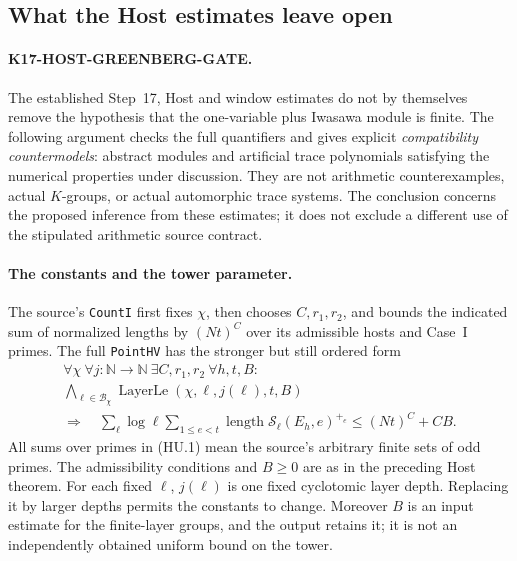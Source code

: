 \subsection{What the Host estimates leave open}
\label{sec:host-uniformity-gate}

\paragraph{K17-HOST-GREENBERG-GATE.}
The established Step~17, Host and window estimates do not by themselves
remove the hypothesis that the one-variable plus Iwasawa module is
finite.  The following argument checks the full quantifiers and gives
explicit \emph{compatibility countermodels}: abstract modules and
artificial trace polynomials satisfying the numerical properties under
discussion.  They are not arithmetic counterexamples, actual
$K$-groups, or actual automorphic trace systems.  The conclusion
concerns the proposed inference from these estimates; it does not
exclude a different use of the stipulated arithmetic source contract.

\paragraph{The constants and the tower parameter.}
The source's \texttt{CountI} first fixes $\chi$, then chooses
$C,r_1,r_2$, and bounds the indicated sum of normalized lengths by
$(Nt)^C$ over its admissible hosts and Case~I primes.
The full \texttt{PointHV} has the stronger but still ordered form
\[
 \begin{gathered}
 \forall\chi\ \forall j:\mathbb N\longrightarrow\mathbb N\
 \exists C,r_1,r_2\ \forall h,t,B:\\
 \bigwedge_{\ell\in\mathcal B_\chi}
     \operatorname{LayerLe}(\chi,\ell,j(\ell),t,B)\\
 \Longrightarrow\quad
 \sum_{\ell}\log\ell\sum_{1\le e<t}
       \operatorname{length}\mathcal S_\ell(E_h,e)^{+_e}
       \le (Nt)^C+CB.
 \end{gathered}
 \tag{HU.1}
\]
All sums over primes in (HU.1) mean the source's arbitrary finite sets
of odd primes.  The admissibility conditions and $B\ge0$ are as in the preceding
Host theorem.  For each fixed $\ell$, $j(\ell)$ is one fixed
cyclotomic layer depth.  Replacing it by larger depths permits the
constants to change.  Moreover $B$ is an input estimate for the
finite-layer groups, and the output retains it; it is not an
independently obtained uniform bound on the tower.

